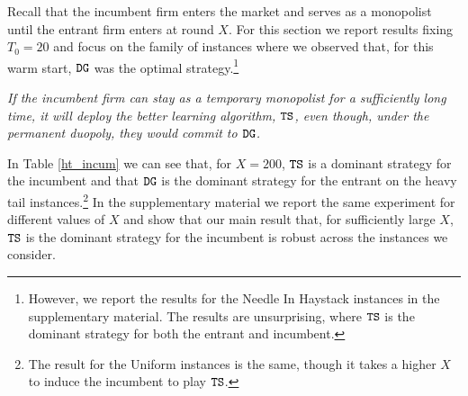 \documentclass[../competing_bandits.tex]{subfiles}
\begin{document}


 Recall that the incumbent firm enters the
market and serves as a monopolist until the entrant firm enters at
round $X$. For this section we report results fixing $T_0 = 20$ and
focus on the family of instances where we observed that, for this warm
start, $\mathtt{DG}$ was the optimal strategy.\footnote{However, we report the
  results for the Needle In Haystack instances in the supplementary
  material. The results are unsurprising, where $\mathtt{TS}$ is the dominant
  strategy for both the entrant and incumbent.} 

\begin{finding}
  \textit{If the incumbent firm can stay as a temporary monopolist for
    a sufficiently long time, it will deploy the better learning
    algorithm, $\mathtt{TS}$, even though, under the permanent duopoly, they
    would commit to $\mathtt{DG}$.}
\end{finding}

In Table \ref{ht_incum} we can see that, for $X = 200$, $\mathtt{TS}$ is a dominant strategy for the incumbent and that $\mathtt{DG}$ is the dominant strategy for the entrant on the heavy tail instances.\footnote{The result for the Uniform instances is the same, though it takes a higher $X$ to induce the incumbent to play $\mathtt{TS}$.} In the supplementary material we report the same experiment for different values of $X$ and show that our main result that, for sufficiently large $X$, $\mathtt{TS}$ is the dominant strategy for the incumbent is robust across the instances we consider.
\end{document}

